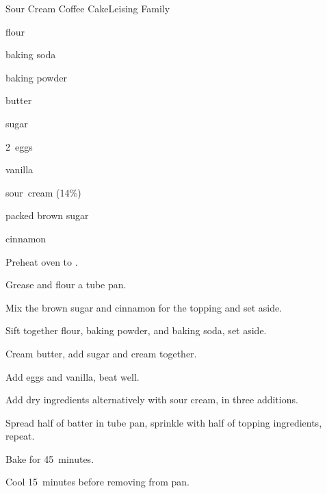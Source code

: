 \begin{recipe}{Sour Cream Coffee Cake}{Leising Family}{}

\begin{ingredients}
\item {} flour
\item {} baking soda
\item {} baking powder
\item \C{\half} butter
\item {} sugar
\item 2~eggs
\item {} vanilla
\item \C{1\threequarter} sour~cream (14\%)
\item \C{\quarter} packed brown sugar
\item \tp{1\half} cinnamon
\end{ingredients}

\begin{directions}
\item Preheat oven to .
\item Grease and flour a  tube pan.
\item Mix the brown sugar and cinnamon for the topping and set aside.
\item Sift together flour, baking powder, and baking soda, set aside.
\item Cream butter, add sugar and cream together.
\item Add eggs and vanilla, beat well.
\item Add dry ingredients alternatively with sour cream, in three additions.
\item Spread half of batter in tube pan, sprinkle with half of topping ingredients, repeat.
\item Bake for 45~minutes.
\item Cool 15~minutes before removing from pan.
\end{directions}

\end{recipe}
